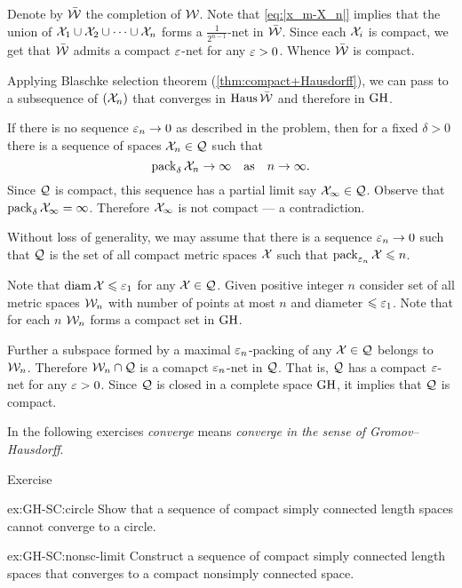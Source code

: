 Denote by $\bar{\mathcal{W}}$ the completion of $\mathcal{W}$.
Note that \ref{eq:|x_m-X_n|} implies that the union of $\mathcal{X}_1\cup \mathcal{X}_2\cup\dots\cup \mathcal{X}_n$ forms a $\tfrac1{2^{n-1}}$-net in $\bar{\mathcal{W}}$.
Since each $\mathcal{X}_i$ is compact, we get that $\bar{\mathcal{W}}$ admits a compact $\varepsilon$-net for any $\varepsilon>0$.
Whence $\bar{\mathcal{W}}$ is compact.

Applying Blaschke selection theorem (\ref{thm:compact+Hausdorff}),
we can pass to a subsequence of $(\mathcal{X}_n)$ that converges in $\operatorname{\rm Haus}\nolimits\bar{\mathcal{W}}$ and therefore in $\operatorname{\rm GH}\nolimits$.
\qeds

If there is no sequence $\varepsilon_n\to0$ as described in the problem, then for a fixed $\delta>0$
there is a sequence of spaces $\mathcal{X}_n\in\mathcal{Q}$ such that $$\operatorname{\rm pack}\nolimits_\delta \mathcal{X}_n\to\infty
\quad\text{as}\quad
n\to\infty.$$
Since $\mathcal{Q}$ is compact, 
this sequence has a partial limit say $\mathcal{X}_\infty\in\mathcal{Q}$.
Observe that $\operatorname{\rm pack}\nolimits_{\delta} \mathcal{X}_\infty=\infty$.
Therefore $\mathcal{X}_\infty$ is not compact --- a contradiction.

Without loss of generality, we may assume that there is a sequence $\varepsilon_n\to 0$ such that 
$\mathcal{Q}$ is the set of all compact metric spaces $\mathcal{X}$ such that
$\operatorname{\rm pack}\nolimits_{\varepsilon_n} \mathcal{X}\leqslant n$.

Note that $\operatorname{\rm diam}\nolimits \mathcal{X}\leqslant \varepsilon_1$ for any $\mathcal{X}\in \mathcal{Q}$.
Given positive integer $n$ consider set of all metric spaces $\mathcal{W}_n$
with number of points at most $n$ and diameter $\leqslant \varepsilon_1$.
Note that for each $n$ $\mathcal{W}_n$ forms a compact set in $\operatorname{\rm GH}\nolimits$.

Further a subspace formed by a maximal $\varepsilon_n$-packing of any $\mathcal{X}\in\mathcal{Q}$ belongs to $\mathcal{W}_n$.
Therefore $\mathcal{W}_n\cap\mathcal{Q}$ is a comapct $\varepsilon_n$-net in  $\mathcal{Q}$.
That is, $\mathcal{Q}$ has a compact $\varepsilon$-net for any $\varepsilon>0$.
Since $\mathcal{Q}$ is closed in a complete space $\operatorname{\rm GH}\nolimits$, it implies that $\mathcal{Q}$ is compact.
\qeds

In the following exercises {}\emph{converge} means {}\emph{converge in the sense of Gromov--Hausdorff}.

\begin{thm}{Exercise}\label{ex:GH-SC}
\begin{subthm}{ex:GH-SC:circle}
Show that a sequence of compact simply connected length spaces cannot converge to a circle.
\end{subthm}

\begin{subthm}{ex:GH-SC:nonsc-limit}
Construct a sequence of compact simply connected length spaces that converges to a compact nonsimply connected space.
\end{subthm}
\end{thm}

